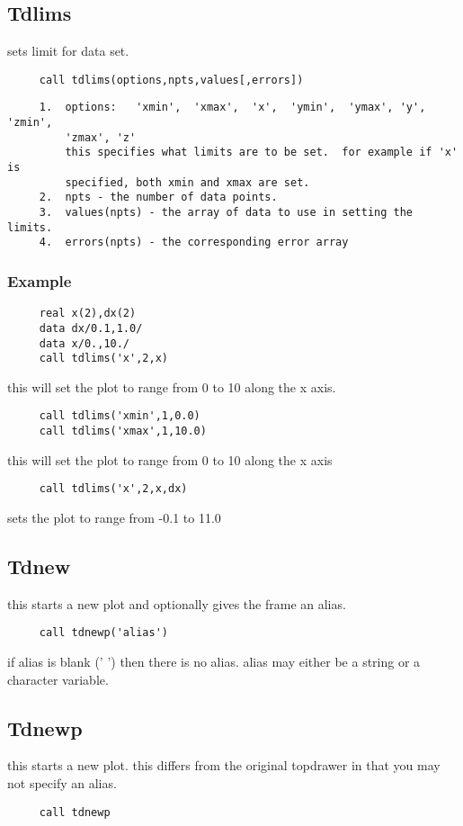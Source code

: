\subsection{Tdlims}
sets limit for data set.  
\begin{verbatim}
     call tdlims(options,npts,values[,errors]) 
\end{verbatim}

\begin{verbatim}
     1.  options:   'xmin',  'xmax',  'x',  'ymin',  'ymax', 'y', 'zmin',
         'zmax', 'z' 
         this specifies what limits are to be set.  for example if 'x' is
         specified, both xmin and xmax are set.  
     2.  npts - the number of data points.  
     3.  values(npts) - the array of data to use in setting the limits.  
     4.  errors(npts) - the corresponding error array 
\end{verbatim}
\subsubsection{Example}
\begin{verbatim}
     real x(2),dx(2) 
     data dx/0.1,1.0/ 
     data x/0.,10./ 
     call tdlims('x',2,x) 
\end{verbatim}
this will set the plot to range from 0 to 10 along the x axis.  
\begin{verbatim}
     call tdlims('xmin',1,0.0) 
     call tdlims('xmax',1,10.0) 
\end{verbatim}
this will set the plot to range from 0 to 10 along the x axis 
\begin{verbatim}
     call tdlims('x',2,x,dx) 
\end{verbatim}
sets the plot to range from -0.1 to 11.0 
\subsection{Tdnew}
this starts a new plot and optionally gives the frame an alias.  
\begin{verbatim}
     call tdnewp('alias') 
\end{verbatim}
if  alias  is  blank (' ') then there is no alias.  alias may either be a
string or a character variable.  
\subsection{Tdnewp}
this starts a new plot.  this differs from the original topdrawer in that
you may not specify an alias.  
\begin{verbatim}
     call tdnewp 
\end{verbatim}
